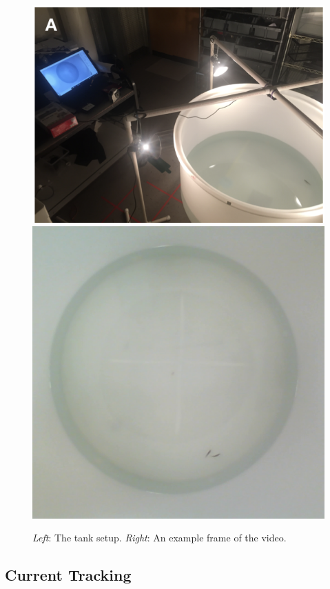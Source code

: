 \documentclass{article}
\newlength{\mylen}
\begin{document}
\begin{figure}[H]
	\centering
	\setlength{\mylen}{0.35\linewidth}
	\includegraphics[height=\mylen]{experimental_design}
	\hspace{0.01\linewidth}
	\includegraphics[height=\mylen]{figures.frame5140}
	\caption{\emph{Left}: The tank setup. \emph{Right}: An example frame of the video.}
\end{figure}


\subsection{Current Tracking}
\end{document}
